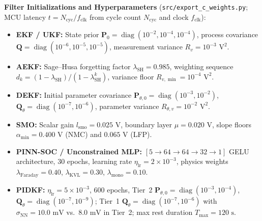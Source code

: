 \documentclass[10pt,a4paper]{article}
\begin{document}
\noindent\textbf{Filter Initializations and Hyperparameters} (\texttt{src/\allowbreak export\_c\_weights.py}; MCU latency $t = N_{\text{cyc}}/f_{\text{clk}}$ from cycle count $N_{\text{cyc}}$ and clock $f_{\text{clk}}$):
\begin{itemize}
\item \textbf{EKF / UKF:} State prior $\mathbf{P}_0 = \operatorname{diag}(10^{-2}, 10^{-4}, 10^{-4})$, process covariance $\mathbf{Q} = \operatorname{diag}(10^{-6}, 10^{-5}, 10^{-5})$, measurement variance $R_v = 10^{-3}\text{ V}^2$.
\item \textbf{AEKF:} Sage--Husa forgetting factor $\lambda_{\text{SH}} = 0.985$, weighting sequence $d_k = (1 - \lambda_{\text{SH}})/(1 - \lambda_{\text{SH}}^k)$, variance floor $R_{v,\min} = 10^{-4}\text{ V}^2$.
\item \textbf{DEKF:} Initial parameter covariance $\mathbf{P}_{\theta,0} = \operatorname{diag}(10^{-3}, 10^{-2})$, $\mathbf{Q}_\theta = \operatorname{diag}(10^{-7}, 10^{-6})$, parameter variance $R_{\theta,v} = 10^{-2}\text{ V}^2$.
\item \textbf{SMO:} Scalar gain $l_{\text{smo}} = 0.025\text{ V}$, boundary layer $\mu = 0.020\text{ V}$, slope floors $\alpha_{\min} = 0.400\text{ V}$ (NMC) and $0.065\text{ V}$ (LFP).
\item \textbf{PINN-SOC / Unconstrained MLP:} $[5 \rightarrow 64 \rightarrow 64 \rightarrow 32 \rightarrow 1]$ GELU architecture, $30$ epochs, learning rate $\eta_{\text{lr}} = 2\times 10^{-3}$, physics weights $\lambda_{\text{Faraday}} = 0.40$, $\lambda_{\text{KVL}} = 0.30$, $\lambda_{\text{mono}} = 0.10$.
\item \textbf{PIDKF:} $\eta_{\text{lr}} = 5\times 10^{-3}$, $600$ epochs, Tier~2 $\mathbf{P}_{\theta,0} = \operatorname{diag}(10^{-3}, 10^{-4})$, $\mathbf{Q}_\theta = \operatorname{diag}(10^{-7}, 10^{-9})$; Tier~1 $\mathbf{Q}_\theta = \operatorname{diag}(10^{-7}, 10^{-6})$ with $\sigma_{\text{NN}} = 10.0\text{ mV}$ vs.\ $8.0\text{ mV}$ in Tier~2; max rest duration $T_{\max} = 120\text{ s}$.
\end{itemize}
\end{document}
